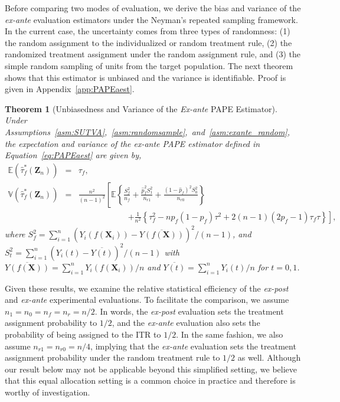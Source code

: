 \documentclass[USenglish,onecolumn]{article}
\renewcommand\r{\right}
\renewcommand\l{\left}
\newcommand\E{\mathbb{E}}
\newcommand\V{\mathbb{V}}
\newcommand\bX{\bm{X}}
\newcommand\bZ{\bm{Z}}
\newtheorem{theorem}{Theorem}
\begin{document}
Before comparing two modes of evaluation, we derive the bias and
variance of the \textit{ex-ante} evaluation estimators under the
Neyman's repeated sampling framework.  In the current case, the
uncertainty comes from three types of randomness: (1) the random
assignment to the individualized or random treatment rule, (2) the
randomized treatment assignment under the random assignment rule, and
(3) the simple random sampling of units from the target population.
The next theorem shows that this estimator is unbiased and the
variance is identifiable.  Proof is given in
Appendix~\ref{app:PAPEaest}.
\begin{theorem}[Unbiasedness and Variance of the \textit{Ex-ante}  PAPE
	Estimator] \label{thm:PAPEaest}  Under
	Assumptions~\ref{asm:SUTVA},~\ref{asm:randomsample},~and~\ref{asm:exante_random},
	the expectation and variance of the {\it ex-ante} PAPE estimator defined in
	Equation~\eqref{eq:PAPEaest} are given by,
	\begin{eqnarray*}
		\E(\hat\tau_f^\ast(\bZ_n)) & = & \tau_f, \\
		\V(\hat\tau_f^\ast(\bZ_n)) & = &
		\frac{n^2}{(n-1)^2}\l[\E\l\{\frac{S_f^2}{n_f}+\frac{\hat{p}_f^2S_{1}^2}{n_{r1}}+\frac{(1-\hat{p}_f)^2S_{0}^2}{n_{r0}}\r\}\r.\\
		& & \hspace{1in} \l.
		+\frac{1}{n^2} \l\{\tau_f^2 -n p_f(1-p_f)
		\tau^2 + 2(n-1)(2p_f-1) \tau_f\tau \r\}\r],
	\end{eqnarray*}
	where
	$S_f^2= \sum_{i=1}^n (Y_i(f(\bX_i))- \overline{Y(f(\bX))})^2/(n-1)$,
	and $S_{t}^2 = \sum_{i=1}^n (Y_i(t) -\overline{Y(t)})^2/(n-1)$ with
	$\overline{Y(f(\bX))}=\sum_{i=1}^n Y_i(f(\bX_i))/n$ and
	$\overline{Y(t)}=\sum_{i=1}^n Y_i(t)/n$ for $t=0,1$.
\end{theorem}

Given these results, we examine the relative statistical efficiency of
the \textit{ex-post} and \textit{ex-ante} experimental evaluations.
To facilitate the comparison, we assume $n_1 = n_0 = n_f = n_r = n/2$.
In words, the \textit{ex-post} evaluation sets the treatment
assignment probability to $1/2$, and the \textit{ex-ante} evaluation
also sets the probability of being assigned to the ITR to $1/2$.  In
the same fashion, we also assume $n_{r1} = n_{r0} = n/4$, implying
that the \textit{ex-ante} evaluation sets the treatment assignment
probability under the random treatment rule to $1/2$ as well. Although
our result below may not be applicable beyond this simplified setting,
we believe that this equal allocation setting is a common choice in
practice and therefore is worthy of investigation.
\end{document}
